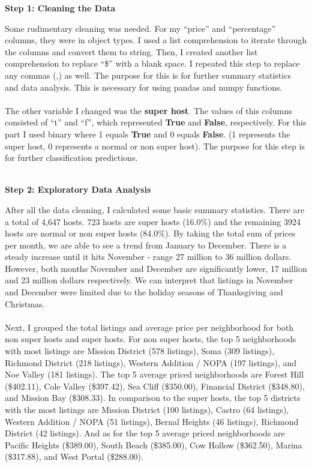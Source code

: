 \documentclass[10pt,letterpapter]{article}
\begin{document}
\textbf{Step 1: Cleaning the Data} 
\begin{paragraph}
\indent
Some rudimentary cleaning was needed. For my \enquote{price} and \enquote{percentage} columns, they were in object types. I used a list comprehension to iterate through the columns and convert them to string. Then, I created another list comprehension to replace \enquote{\$} with a blank space. I repeated this step to replace any commas (,) as well. The purpose for this is for further summary statistics and data analysis. This is necessary for using pandas and numpy functions. 
\\ \\ 
\indent \indent
The other variable I changed was the \textbf{super host}. The values of this columns consisted of \enquote{t} and \enquote{f}, which represented \textbf{True} and \textbf{False}, respectively. For this part I used binary where 1 equals \textbf{True} and 0 equals \textbf{False}. (1 represents the super host, 0 represents a normal or non super host). The purpose for this step is for further classification predictions. 

\end{paragraph}

\indent \\
\textbf{Step 2: Exploratory Data Analysis} 
\begin{paragraph}
\indent
After all the data cleaning, I calculated some basic summary statistics. There are a total of 4,647 hosts. 723 hosts are super hosts (16.0\%) and the remaining 3924 hosts are normal or non super hosts (84.0\%).  By taking the total sum of prices per month, we are able to see a trend from January to December. There is a steady increase until it hits November - range 27 million to 36 million dollars. However, both months November and December are significantly lower, 17 million and 23 million dollars respectively. We can interpret that listings in November and December were limited due to the holiday seasons of Thanksgiving and Christmas. 
\\ \\
\indent \indent
Next, I grouped the total listings and average price per neighborhood for both non super hosts and super hosts. For non super hosts, the top 5 neighborhoods with most listings are Mission District (578 listings), Soma (309 listings), Richmond District (218 listings), Western Addition / NOPA (197 listings), and Noe Valley (181 listings). The top 5 average priced neighborhoods are Forest Hill (\$402.11), Cole Valley (\$397.42), Sea Cliff (\$350.00), Financial District (\$348.80), and Mission Bay (\$308.33). In comparison to the super hosts, the top 5 districts with the most listings are Mission District (100 listings), Castro (64 listings), Western Addition / NOPA (51 listings), Bernal Heights (46 listings), Richmond District (42 listings). And as for the top 5 average priced neighborhoods are Pacific Heights (\$389.00), South Beach (\$385.00), Cow Hollow (\$362.50), Marina (\$317.88), and West Portal (\$288.00). 

\end{paragraph}
\end{document}

